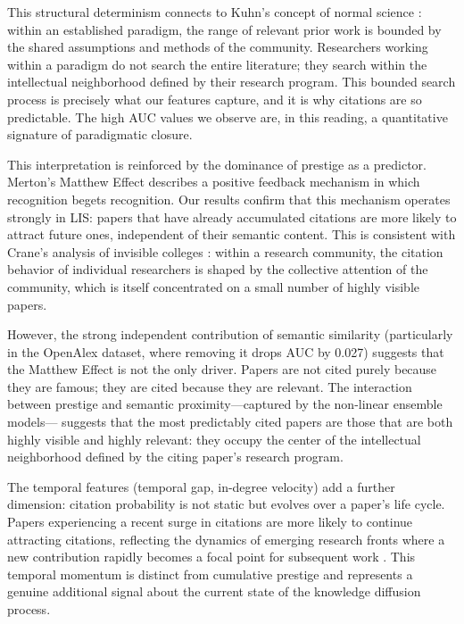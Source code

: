 \documentclass[12pt,a4paper]{article}
\begin{document}
This structural determinism connects to Kuhn's concept of normal science
\citep{kuhn1962structure}: within an established paradigm, the range of relevant
prior work is bounded by the shared assumptions and methods of the community.
Researchers working within a paradigm do not search the entire literature; they
search within the intellectual neighborhood defined by their research program.
This bounded search process is precisely what our features capture, and it is why
citations are so predictable. The high AUC values we observe are, in this reading,
a quantitative signature of paradigmatic closure.

This interpretation is reinforced by the dominance of prestige as a predictor.
Merton's Matthew Effect \citep{merton1968matthew} describes a positive feedback
mechanism in which recognition begets recognition. Our results confirm that this
mechanism operates strongly in LIS: papers that have already accumulated citations
are more likely to attract future ones, independent of their semantic content.
This is consistent with Crane's analysis of invisible colleges
\citep{crane1972invisible}: within a research community, the citation behavior of
individual researchers is shaped by the collective attention of the community,
which is itself concentrated on a small number of highly visible papers.

However, the strong independent contribution of semantic similarity (particularly
in the OpenAlex dataset, where removing it drops AUC by 0.027) suggests that the
Matthew Effect is not the only driver. Papers are not cited purely because they
are famous; they are cited because they are relevant. The interaction between
prestige and semantic proximity---captured by the non-linear ensemble models---
suggests that the most predictably cited papers are those that are both highly
visible and highly relevant: they occupy the center of the intellectual neighborhood
defined by the citing paper's research program.

The temporal features (temporal gap, in-degree velocity) add a further dimension:
citation probability is not static but evolves over a paper's life cycle. Papers
experiencing a recent surge in citations are more likely to continue attracting
citations, reflecting the dynamics of emerging research fronts where a new
contribution rapidly becomes a focal point for subsequent work \citep{redner2005citation}.
This temporal momentum is distinct from cumulative prestige and represents a genuine
additional signal about the current state of the knowledge diffusion process.
\end{document}
